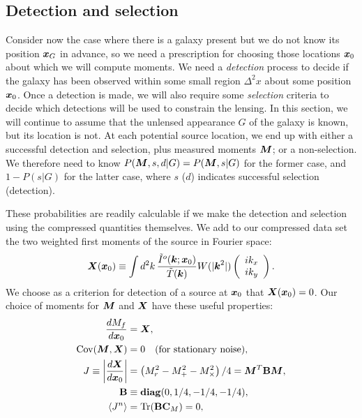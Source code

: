 \documentclass[11pt,preprint,flushrt]{aastex}
\newcommand{\vecX}{\mbox{\boldmath $X$}}
\newcommand{\vecM}{\mbox{\boldmath $M$}}
\newcommand{\vecx}{\mbox{\boldmath $x$}}
\newcommand{\veck}{\mbox{\boldmath $k$}}
\newcommand{\matC}{\mbox{$\bf C$}}
\newcommand{\matB}{\mbox{$\bf B$}}
\newcommand\edit[1]{#1}
\begin{document}
\subsection{Detection and selection}
Consider now the case where there is a galaxy present but we do not
know its position $\vecx_G$ in advance, \edit{so we need a
  prescription for choosing those locations $\vecx_0$ about which we
  will compute moments.} We need a \emph{detection}
process to decide if the galaxy has been observed within some small
region $\Delta^2x$ about some position $\vecx_0$.  Once a detection is
made, we will also require some \emph{selection} criteria to decide
which detections will be used to constrain the lensing.  \edit{In this section, we will continue to assume that the
unlensed appearance $G$ of the galaxy is known, but its location is
not.} At each
potential source location, we end up with either a
successful detection and selection, plus measured moments $\vecM$; or
a non-selection.  We therefore need to know $P(\vecM,s,d|G) = P(\vecM,s | G)$ for the
former case, and $1-P(s|G)$ for the latter case, where $s$ ($d$)
indicates successful selection (detection).

These probabilities are readily calculable if we make the detection
and selection using the compressed quantities themselves.  We add to
our compressed data set the two weighted first moments of the source
in Fourier space:
\begin{equation}
\vecX(\vecx_0) \equiv \int d^2k\, \frac{\tilde I^o(\veck; \vecx_0)}{\tilde T(\veck)}
W(|\veck^2|) 
\left( \begin{array}{c}
ik_x \\
ik_y
\end{array}
\right).
\end{equation}
We choose as a criterion for detection of a source at $\vecx_0$ that
$\vecX(\vecx_0)=0$.  Our choice of moments for $\vecM$ and $\vecX$ have these
useful properties:
\begin{align}
\frac{dM_f}{d\vecx_0} & = \vecX, \\
{\rm Cov}(\vecM, \vecX) & = 0 \quad \mbox{(for stationary noise)}, \\
\label{Jdef}
J \equiv \left| \frac{d \vecX}{d \vecx_0} \right| & =
                                                          \left(M_r^2
                                                          - M_+^2 -
                                                          M_\times^2\right)/4
                                                                  =
                                                                  \vecM^T
                                                                  \matB
                                                                  \vecM,
  \\
\matB & \equiv  {\bf diag}(0,1/4,-1/4,-1/4), \\
\langle J^n \rangle & = {\rm Tr}(\matB\matC_M)=0, 
\end{align}
\end{document}
